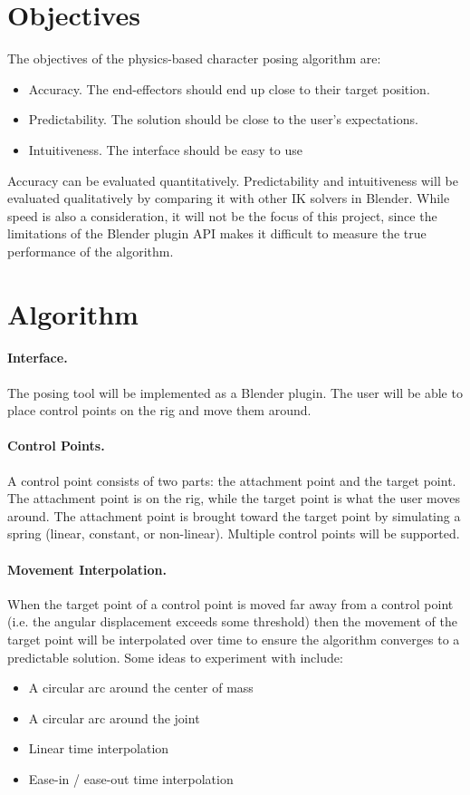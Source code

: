 \documentclass[10pt,twocolumn,letterpaper]{article}
\begin{document}
\section*{Objectives} The objectives of the physics-based character posing algorithm are:
\begin{itemize}
    \item Accuracy. The end-effectors should end up close to their target position.
    \item Predictability. The solution should be close to the user's expectations.  
    \item Intuitiveness. The interface should be easy to use 
\end{itemize}

Accuracy can be evaluated quantitatively. Predictability and intuitiveness will be evaluated qualitatively by comparing it with other IK solvers in Blender. While speed is also a consideration, it will not be the focus of this project, since the limitations of the Blender plugin API makes it difficult to measure the true performance of the algorithm.

\section*{Algorithm}

\paragraph{Interface.} The posing tool will be implemented as a Blender plugin. The user will be able to place control points on the rig and move them around. 

\paragraph{Control Points.} A control point consists of two parts: the attachment point and the target point. The attachment point is on the rig, while the target point is what the user moves around. The attachment point is brought toward the target point by simulating a spring (linear, constant, or non-linear). Multiple control points will be supported.

\paragraph{Movement Interpolation.} When the target point of a control point is moved far away from a control point (i.e. the angular displacement exceeds some threshold) then the movement of the target point will be interpolated over time to ensure the algorithm converges to a predictable solution. Some ideas to experiment with include:
\begin{itemize}
    \item A circular arc around the center of mass
    \item A circular arc around the joint
    \item Linear time interpolation
    \item Ease-in / ease-out time interpolation
\end{itemize}
\end{document}
